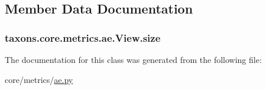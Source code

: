 \subsection{Member Data Documentation}
\subsubsection[{\texorpdfstring{size}{size}}]{\setlength{\rightskip}{0pt plus 5cm}taxons.\+core.\+metrics.\+ae.\+View.\+size}\hypertarget{classtaxons_1_1core_1_1metrics_1_1ae_1_1_view_a784e56422a9ccd2a88afce7d3ca2b42e}{}\label{classtaxons_1_1core_1_1metrics_1_1ae_1_1_view_a784e56422a9ccd2a88afce7d3ca2b42e}


The documentation for this class was generated from the following file\+:\begin{DoxyCompactItemize}
\item 
core/metrics/\hyperlink{ae_8py}{ae.\+py}\end{DoxyCompactItemize}
